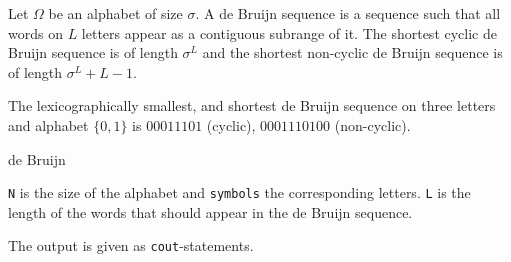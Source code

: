 Let $\Omega$ be an alphabet of size $\sigma$. A de Bruijn sequence is
a sequence such that all words on $L$ letters appear as a contiguous
subrange of it.  The shortest cyclic de Bruijn sequence is of
length $\sigma^L$ and the shortest non-cyclic de Bruijn sequence is of
length $\sigma^L+L-1$.

The lexicographically smallest, and shortest de Bruijn sequence on
three letters and alphabet $\{0,1\}$ is $00011101$ (cyclic),
$0001110100$ (non-cyclic).

\begin{algorithm}{de Bruijn}

\desc
{\tt N} is the size of the alphabet and {\tt symbols} the
corresponding letters. {\tt L} is the length of the words that should
appear in the de Bruijn sequence.

The output is given as {\tt cout}-statements.
\end{algorithm}

